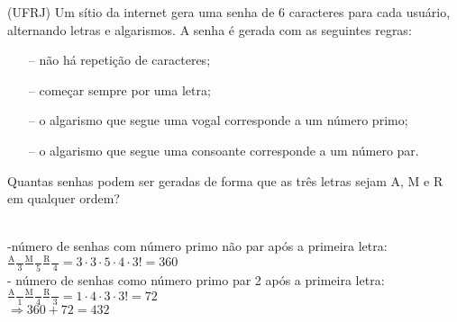 \begin{ex}
 (UFRJ) Um sítio da internet gera uma senha de 6 caracteres para cada usuário, alternando letras e algarismos. A senha é gerada  com as seguintes regras:
    \begin{itemize}
    \item[--] não há repetição de caracteres;
    \item[--] começar sempre por uma letra;
    \item[--] o algarismo que segue uma vogal corresponde a um número primo;
    \item[--] o algarismo que segue uma consoante corresponde a um número par.
    \end{itemize}
Quantas senhas podem ser geradas de forma que as três letras sejam A, M e R em qualquer ordem?
   \begin{sol}
      \phantom{A}  \\
    -número de senhas com número primo não par após a primeira letra:\\
     $\frac{\mathrm{A}}{\phantom{A}}\frac{\phantom{A}}{3}\frac{\mathrm{M}}{\phantom{A}}\frac{\phantom{A}}{5}\frac{\mathrm{R}}{\phantom{A}}\frac{\phantom{A}}{4}=3\cdot3\cdot5\cdot4\cdot3!=360$ \\
   - número de senhas como número primo par 2 após a primeira letra: \\
    $\frac{\mathrm{A}}{\phantom{A}}\frac{\phantom{A}}{1}\frac{\mathrm{M}}{\phantom{A}}\frac{\phantom{A}}{4}\frac{\mathrm{R}}{\phantom{A}}\frac{\phantom{A}}{3}=1\cdot4\cdot3\cdot3!=72$\\
   $ \Longrightarrow 360+72=432$
  
   \end{sol}
\end{ex}